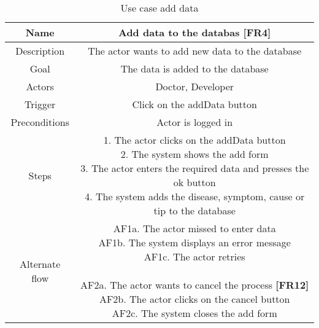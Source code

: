 \begin{table}[H]
	\begin{center}\scriptsize
		\begin{tabular}{ |c|c| } 
			\hline	
			Name & Add data to the databas  \textbf{[FR4]} \\
			\hline
			Description & The actor wants to add new data to the database \\ 
			\hline
			Goal & The data is added to the database \\ 
			\hline
			Actors & Doctor, Developer \\ 
			\hline
			Trigger & Click on the addData button \\ 
			\hline
			Preconditions & Actor is logged in \\ 
			\hline
			Steps & \parbox{9cm}{\vspace{.5\baselineskip}
				1. The actor clicks on the addData button\\
				2. The system shows the add form\\
				3. The actor enters the required data and presses the ok button\\
				4. The system adds the disease, symptom, cause or tip to the database\\ } \\
			\hline
			Alternate flow & \parbox{9cm}{\vspace{.5\baselineskip}
				AF1a. The actor missed to enter data\\
				AF1b. The system displays an error message\\
				AF1c. The actor retries\\\\
				AF2a. The actor wants to cancel the process \textbf{[FR12]}\\
				AF2b. The actor clicks on the cancel button\\
				AF2c. The system closes the add form}\\ 
			\hline
		\end{tabular}
	\end{center}\normalsize
	\caption{Use case add data}
\end{table}
